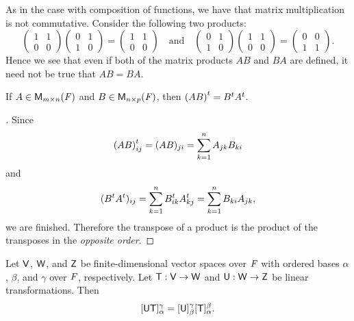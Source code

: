 \begin{note}
  As in the case with composition of functions, we have that matrix multiplication is not commutative. Consider the following two products:
  \[
    \begin{pmatrix}
      1 & 1 \\
      0 & 0
    \end{pmatrix} \begin{pmatrix}
      0 & 1 \\
      1 & 0
    \end{pmatrix} = \begin{pmatrix}
      1 & 1 \\
      0 & 0
    \end{pmatrix} \quad \text{and} \quad \begin{pmatrix}
      0 & 1 \\
      1 & 0
    \end{pmatrix} \begin{pmatrix}
      1 & 1 \\
      0 & 0
    \end{pmatrix} = \begin{pmatrix}
      0 & 0 \\
      1 & 1
    \end{pmatrix}.
  \]
  Hence we see that even if both of the matrix products \(AB\) and \(BA\) are defined, it need not be true that \(AB = BA\).
\end{note}

\begin{eg}\label{2.3.2}
  If \(A \in \mathsf{M}_{{m} \times n}({\mathit{F}})\) and \(B \in \mathsf{M}_{{n} \times p}({\mathit{F}})\), then \({(AB)}^{t} = {B}^{t} {A}^{t}\).
\end{eg}

\begin{proof}[]
  Since
  \[
    {(AB)}^{t}_{i j} = (AB)_{j i} = \sum_{k = 1}^n A_{j k} B_{k i}
  \]
  and
  \[
    ({B}^{t} {A}^{t})_{i j} = \sum_{k = 1}^n {B}^{t}_{i k} {A}^{t}_{k j} = \sum_{k = 1}^n B_{k i} A_{j k},
  \]
  we are finished.
  Therefore the transpose of a product is the product of the transposes in the \emph{opposite order}.
\end{proof}

\begin{thm}\label{2.11}
  Let \(\mathsf{V}\), \(\mathsf{W}\), and \(\mathsf{Z}\) be finite-dimensional vector spaces over \(\mathit{F}\) with ordered bases \(\alpha\), \(\beta\), and \(\gamma\) over \(\mathit{F}\), respectively.
  Let \(\mathsf{T} : \mathsf{V} \to \mathsf{W}\) and \(\mathsf{U} : \mathsf{W} \to \mathsf{Z}\) be linear transformations.
  Then
  \[
    [\mathsf{U} \mathsf{T}]_{\alpha}^{\gamma} = [\mathsf{U}]_{\beta}^{\gamma} [\mathsf{T}]_{\alpha}^{\beta}.
  \]
\end{thm}

